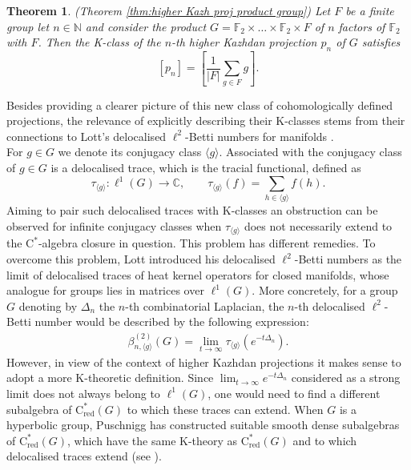\documentclass[a4paper,leqno,12pt]{article}
\numberwithin{equation}{section}
\theoremstyle{plain}
\newtheorem{introtheorem}{Theorem}
\theoremstyle{definition}
\theoremstyle{remark}
\newcommand{\Cs}{\mathrm{C}^*}
\newcommand{\Csr}{\mathrm{C}^*_{\text{red}}}
\newcommand{\ra}{\rightarrow}
\begin{document}
	\begin{introtheorem} \label{thm B}
		(Theorem \ref{thm:higher Kazh proj product group})
		Let $F$ be a finite group let $n \in \mathbb N$ and consider the product
		$G = \mathbb F_2 \times \dotsc \times \mathbb F_2 \times F$ of $n$ factors of $\mathbb F_2$ with $F$. Then the K-class of the $n$-th higher Kazhdan projection $p_n$ of $G$ satisfies		
		\[
		[p_n] = \left[\frac{1}{|F|}{\sum_{g\in F}{g}}\right].
		\]
	\end{introtheorem}
	
	Besides providing a clearer picture of this new class of cohomologically defined projections, the relevance of explicitly describing their K-classes stems from their connections to Lott's delocalised $\ell^2$-Betti numbers for manifolds \cite{lott1999}. 
	\\
    For $g\in G$ we denote its conjugacy class $\langle{g}\rangle$.	
	Associated with the conjugacy class of $g \in G$ is a delocalised trace, which is the tracial functional, defined as
	\[
		\tau_{\langle g\rangle} \colon \ell^1(G) \ra \mathbb C
	, \qquad  \tau_{\langle g\rangle}(f) = \sum_{h\in {\langle g\rangle}} {f(h)}.
	\]
	  \indent Aiming to pair such delocalised traces with K-classes an obstruction can be observed for infinite conjugacy classes when $\tau_{\langle g\rangle}$
	does not necessarily extend to the $\Cs$-algebra closure in question. This problem has different remedies.	
	To overcome this problem, Lott introduced his delocalised $\ell^2$-Betti numbers as the limit of delocalised traces of heat kernel operators for closed manifolds, whose analogue for groups lies in matrices over $\ell^1(G)$.	 
	More concretely, for a group $G$ denoting by $\Delta_n$ the $n$-th combinatorial  Laplacian, the $n$-th delocalised $\ell^2$-Betti number would be described by the following expression:
	\begin{gather*}
		\beta^{(2)}_{n, \langle g\rangle}(G) = \lim_{t \to \infty} \tau_{\langle g\rangle}(e^{-t\Delta_n}).
	\end{gather*}
	However, in view of the context of higher Kazhdan projections it makes sense to adopt a more K-theoretic definition. 
	Since $\lim_{t\to \infty}e^{-t\Delta_n}$ considered as a strong limit does not always belong to $\ell^1(G)$, one would need to find a different subalgebra of $\Csr(G)$ to which these traces can extend. 	
	When $G$ is a hyperbolic group, Puschnigg has constructed suitable smooth dense subalgebras of $\Csr(G)$, which have the same K-theory as $\Csr(G)$ and to which delocalised traces extend (see \cite{puschnigg2010}). 
		
\end{document}
